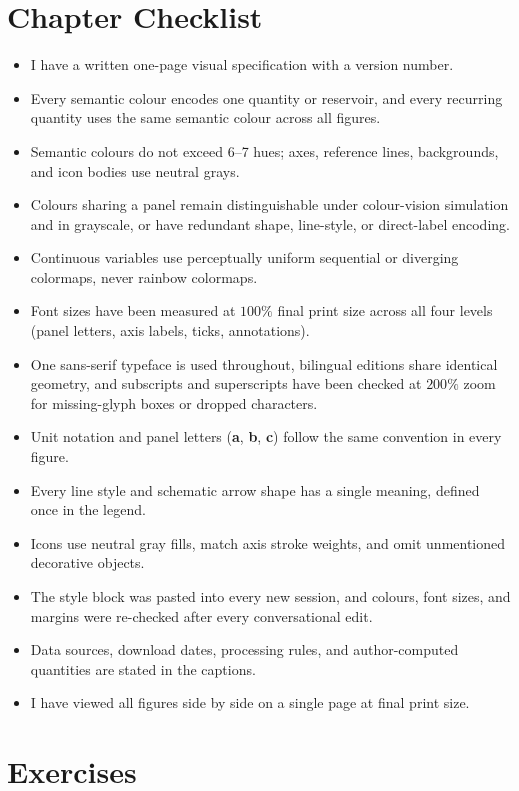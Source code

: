 \section{Chapter Checklist}

\begin{itemize}
\item I have a written one-page visual specification with a version number.
\item Every semantic colour encodes one quantity or reservoir, and every recurring quantity uses the same semantic colour across all figures.
\item Semantic colours do not exceed 6--7 hues; axes, reference lines, backgrounds, and icon bodies use neutral grays.
\item Colours sharing a panel remain distinguishable under colour-vision simulation and in grayscale, or have redundant shape, line-style, or direct-label encoding.
\item Continuous variables use perceptually uniform sequential or diverging colormaps, never rainbow colormaps.
\item Font sizes have been measured at $100\%$ final print size across all four levels (panel letters, axis labels, ticks, annotations).
\item One sans-serif typeface is used throughout, bilingual editions share identical geometry, and subscripts and superscripts have been checked at $200\%$ zoom for missing-glyph boxes or dropped characters.
\item Unit notation and panel letters (\textbf{a}, \textbf{b}, \textbf{c}) follow the same convention in every figure.
\item Every line style and schematic arrow shape has a single meaning, defined once in the legend.
\item Icons use neutral gray fills, match axis stroke weights, and omit unmentioned decorative objects.
\item The style block was pasted into every new session, and colours, font sizes, and margins were re-checked after every conversational edit.
\item Data sources, download dates, processing rules, and author-computed quantities are stated in the captions.
\item I have viewed all figures side by side on a single page at final print size.
\end{itemize}

\section{Exercises}

